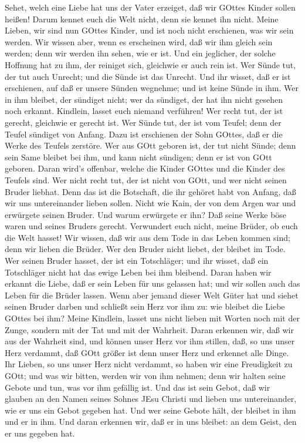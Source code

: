  Sehet, welch eine Liebe hat uns der Vater erzeiget, daß wir
GOttes Kinder sollen heißen! Darum kennet euch die Welt nicht, denn sie
kennet ihn nicht.  Meine Lieben, wir sind nun GOttes Kinder,
und ist noch nicht erschienen, was wir sein werden. Wir wissen aber,
wenn es erscheinen wird, daß wir ihm gleich sein werden; denn wir werden
ihn sehen, wie er ist.  Und ein jeglicher, der solche
Hoffnung hat zu ihm, der reiniget sich, gleichwie er auch rein ist.
 Wer Sünde tut, der tut auch Unrecht; und die Sünde ist das
Unrecht.  Und ihr wisset, daß er ist erschienen, auf daß er
unsere Sünden wegnehme; und ist keine Sünde in ihm.  Wer in
ihm bleibet, der sündiget nicht; wer da sündiget, der hat ihn nicht
gesehen noch erkannt.  Kindlein, lasset euch niemand
verführen! Wer recht tut, der ist gerecht, gleichwie er gerecht ist.
 Wer Sünde tut, der ist vom Teufel; denn der Teufel sündiget
von Anfang. Dazu ist erschienen der Sohn GOttes, daß er die Werke des
Teufels zerstöre.  Wer aus GOtt geboren ist, der tut nicht
Sünde; denn sein Same bleibet bei ihm, und kann nicht sündigen; denn er
ist von GOtt geboren.  Daran wird's offenbar, welche die
Kinder GOttes und die Kinder des Teufels sind. Wer nicht recht tut, der
ist nicht von GOtt, und wer nicht seinen Bruder liebhat. 
Denn das ist die Botschaft, die ihr gehöret habt von Anfang, daß wir uns
untereinander lieben sollen.  Nicht wie Kain, der von dem
Argen war und erwürgete seinen Bruder. Und warum erwürgete er ihn? Daß
seine Werke böse waren und seines Bruders gerecht. 
Verwundert euch nicht, meine Brüder, ob euch die Welt hasset!
 Wir wissen, daß wir aus dem Tode in das Leben kommen sind;
denn wir lieben die Brüder. Wer den Bruder nicht liebet, der bleibet im
Tode.  Wer seinen Bruder hasset, der ist ein Totschläger;
und ihr wisset, daß ein Totschläger nicht hat das ewige Leben bei ihm
bleibend.  Daran haben wir erkannt die Liebe, daß er sein
Leben für uns gelassen hat; und wir sollen auch das Leben für die Brüder
lassen.  Wenn aber jemand dieser Welt Güter hat und siehet
seinen Bruder darben und schließt sein Herz vor ihm zu: wie bleibet die
Liebe GOttes bei ihm?  Meine Kindlein, lasset uns nicht
lieben mit Worten noch mit der Zunge, sondern mit der Tat und mit der
Wahrheit.  Daran erkennen wir, daß wir aus der Wahrheit
sind, und können unser Herz vor ihm stillen,  daß, so uns
unser Herz verdammt, daß GOtt größer ist denn unser Herz und erkennet
alle Dinge.  Ihr Lieben, so uns unser Herz nicht verdammt,
so haben wir eine Freudigkeit zu GOtt;  und was wir bitten,
werden wir von ihm nehmen; denn wir halten seine Gebote und tun, was vor
ihm gefällig ist.  Und das ist sein Gebot, daß wir glauben
an den Namen seines Sohnes JEsu Christi und lieben uns untereinander,
wie er uns ein Gebot gegeben hat.  Und wer seine Gebote
hält, der bleibet in ihm und er in ihm. Und daran erkennen wir, daß er
in uns bleibet: an dem Geist, den er uns gegeben hat.

